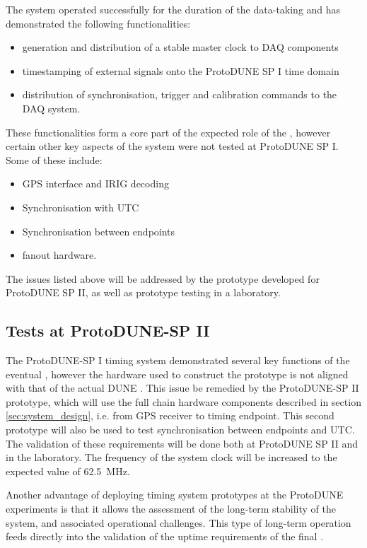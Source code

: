 \documentclass{article}
\begin{document}
The system operated successfully for the duration of the data-taking and has demonstrated the following functionalities:

\begin{itemize}
    \item generation and distribution of a stable master clock to DAQ components
    \item timestamping of external signals onto the ProtoDUNE SP I time domain
    \item distribution of synchronisation, trigger and calibration commands to the DAQ system.
\end{itemize}

These functionalities form a core part of the expected role of the , however certain other key aspects of the system were not tested at ProtoDUNE SP I. Some of these include:

\begin{itemize}
    \item GPS interface and IRIG decoding
    \item Synchronisation with UTC
    \item Synchronisation between endpoints
    \item {} fanout hardware.
\end{itemize}

The issues listed above will be addressed by the prototype developed for ProtoDUNE SP II, as well as prototype testing in a laboratory.

\subsection{Tests at ProtoDUNE-SP II}
The ProtoDUNE-SP I timing system demonstrated several key functions of the eventual , however the hardware used to construct the prototype is not aligned with that of the actual DUNE . This issue be remedied by the ProtoDUNE-SP II prototype, which will use the full chain hardware components described in section \ref{sec:system_design}, i.e. from GPS receiver to timing endpoint. This second prototype will also be used to test synchronisation between endpoints and UTC. The validation of these requirements will be done both at ProtoDUNE SP II and in the laboratory. The frequency of the system clock will be increased to the expected  value of \SI{62.5}{\MHz}.

Another advantage of deploying timing system prototypes at the ProtoDUNE experiments is that it allows the assessment of the long-term stability of the system, and associated operational challenges. This type of long-term operation feeds directly into the validation of the uptime requirements of the final .
\end{document}
